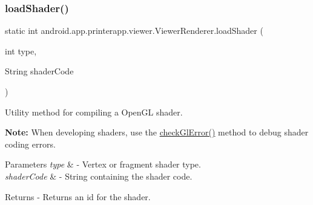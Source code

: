 \mbox{\label{classandroid_1_1app_1_1printerapp_1_1viewer_1_1_viewer_renderer_ae50d5a637643e941fca8d7be4cda890e}} 
\subsubsection{\texorpdfstring{load\+Shader()}{loadShader()}}
{\footnotesize\ttfamily static int android.\+app.\+printerapp.\+viewer.\+Viewer\+Renderer.\+load\+Shader (\begin{DoxyParamCaption}\item[{int}]{type,  }\item[{String}]{shader\+Code }\end{DoxyParamCaption})\hspace{0.3cm}{\ttfamily [static]}}

Utility method for compiling a Open\+GL shader.

{\bfseries Note\+:} When developing shaders, use the \hyperlink{classandroid_1_1app_1_1printerapp_1_1viewer_1_1_viewer_renderer_a504fd4ca6807307b5ffe482a4913ca85}{check\+Gl\+Error()} method to debug shader coding errors.


\begin{DoxyParams}{Parameters}
{\em type} & -\/ Vertex or fragment shader type. \\
\hline
{\em shader\+Code} & -\/ String containing the shader code. \\
\hline
\end{DoxyParams}
\begin{DoxyReturn}{Returns}
-\/ Returns an id for the shader. 
\end{DoxyReturn}
\mbox{\label{classandroid_1_1app_1_1printerapp_1_1viewer_1_1_viewer_renderer_abf337945481fb0c118213fe34bce1c5b}} 
